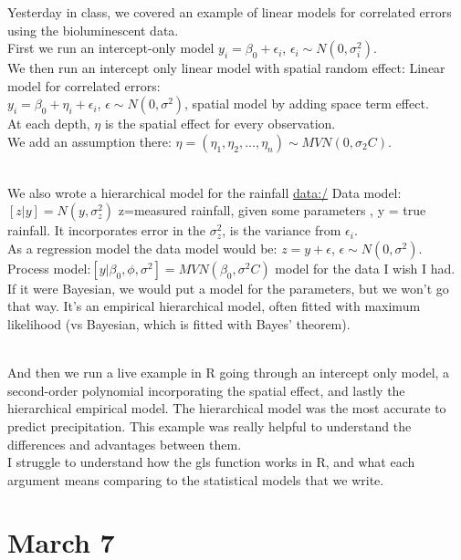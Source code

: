 \documentclass[
]{book}
\begin{document}
Yesterday in class, we covered an example of linear models for correlated errors using the bioluminescent data.\\
First we run an intercept-only model \(y_i=\beta_0+\epsilon_i\), \(\epsilon_i \sim N(0, \sigma^2_i)\).\\
We then run an intercept only linear model with spatial random effect:
Linear model for correlated errors:\\
\(y_i=\beta_0+\eta_i+\epsilon_i\), \(\epsilon \sim N(0,\sigma^2)\), spatial model by adding space term effect.\\
At each depth, \(\eta\) is the spatial effect for every observation.\\
We add an assumption there: \(\eta=(\eta_1, \eta_2,...,\eta_n) \sim MVN(0, \sigma_2C)\).\\
\strut \\
We also wrote a hierarchical model for the rainfall \url{data:/}
Data model:\([z|y]=N(y, \sigma^2_z)\) z=measured rainfall, given some parameters \textbar, y = true rainfall. It incorporates error in the \(\sigma^2_z\), is the variance from \(\epsilon_i\).\\
As a regression model the data model would be: \(z=y+\epsilon\), \(\epsilon \sim N(0, \sigma^2)\).\\
Process model:\([y|\beta_0,\phi,\sigma^2]=MVN(\beta_0,\sigma^2C)\) model for the data I wish I had.\\
If it were Bayesian, we would put a model for the parameters, but we won't go that way. It's an empirical hierarchical model, often fitted with maximum likelihood (vs Bayesian, which is fitted with Bayes' theorem).\\
\strut \\
And then we run a live example in R going through an intercept only model, a second-order polynomial incorporating the spatial effect, and lastly the hierarchical empirical model. The hierarchical model was the most accurate to predict precipitation. This example was really helpful to understand the differences and advantages between them.\\
I struggle to understand how the gls function works in R, and what each argument means comparing to the statistical models that we write.

\hypertarget{march-7}{%
\section{March 7}\label{march-7}}
\end{document}
